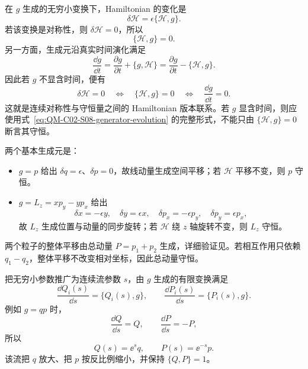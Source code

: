 在 $g$ 生成的无穷小变换下，Hamiltonian 的变化是
\begin{equation}
  \delta\mathcal H
  =\epsilon\{\mathcal H,g\}.
  \label{eq:QM-C02-S08-hamiltonian-variation}
\end{equation}
若该变换是对称性，则 $\delta\mathcal H=0$，所以
\begin{equation}
  \{\mathcal H,g\}=0.
  \label{eq:QM-C02-S08-symmetry-bracket}
\end{equation}
另一方面，生成元沿真实时间演化满足
\begin{equation}
  \frac{\dd g}{\dd t}
  =\frac{\partial g}{\partial t}+\{g,\mathcal H\}
  =\frac{\partial g}{\partial t}-\{\mathcal H,g\}.
  \label{eq:QM-C02-S08-generator-evolution}
\end{equation}
因此若 $g$ 不显含时间，便有
\begin{equation}
  \boxed{
  \delta\mathcal H=0
  \quad\Longleftrightarrow\quad
  \{\mathcal H,g\}=0
  \quad\Longleftrightarrow\quad
  \frac{\dd g}{\dd t}=0.}
  \label{eq:QM-C02-S08-symmetry-conservation}
\end{equation}
这就是连续对称性与守恒量之间的 Hamiltonian 版本联系。若 $g$ 显含时间，则应使用式~\eqref{eq:QM-C02-S08-generator-evolution} 的完整形式，不能只由 $\{\mathcal H,g\}=0$ 断言其守恒。

两个基本生成元是：
\begin{itemize}[leftmargin=*]
  \item $g=p$ 给出 $\delta q=\epsilon$、$\delta p=0$，故线动量生成空间平移；若 $\mathcal H$ 平移不变，则 $p$ 守恒。
  \item $g=L_z=xp_y-yp_x$ 给出
  \[
    \delta x=-\epsilon y,
    \quad
    \delta y=\epsilon x,
    \quad
    \delta p_x=-\epsilon p_y,
    \quad
    \delta p_y=\epsilon p_x,
  \]
  故 $L_z$ 生成位置与动量的同步旋转；若 $\mathcal H$ 绕 $z$ 轴旋转不变，则 $L_z$ 守恒。
\end{itemize}
两个粒子的整体平移由总动量 $P=p_1+p_2$ 生成，详细验证见。若相互作用只依赖 $q_1-q_2$，整体平移不改变相对坐标，因此总动量守恒。


把无穷小参数推广为连续流参数 $s$，由 $g$ 生成的有限变换满足
\begin{equation}
  \frac{\dd Q_i(s)}{\dd s}=\{Q_i(s),g\},
  \qquad
  \frac{\dd P_i(s)}{\dd s}=\{P_i(s),g\}.
  \label{eq:QM-C02-S08-finite-flow}
\end{equation}
例如 $g=qp$ 时，
\[
  \frac{\dd Q}{\dd s}=Q,
  \qquad
  \frac{\dd P}{\dd s}=-P,
\]
所以
\begin{equation}
  Q(s)=\ee^s q,
  \qquad
  P(s)=\ee^{-s}p.
  \label{eq:QM-C02-S08-finite-scaling}
\end{equation}
该流把 $q$ 放大、把 $p$ 按反比例缩小，并保持 $\{Q,P\}=1$。

